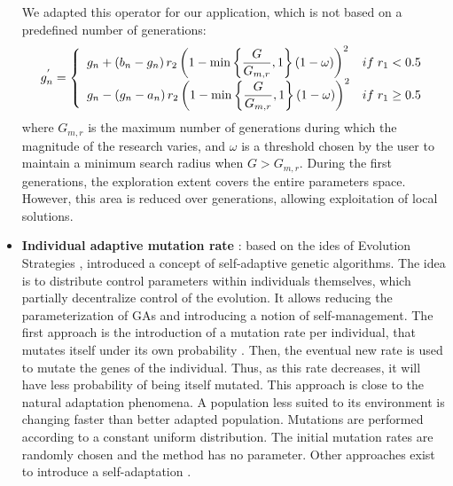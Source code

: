 \documentclass[twocol]{ametsoc}
\begin{document}
\begin{itemize}
	We adapted this operator for our application, which is not based on a predefined number of generations:
	\begin{equation}
	g_{n}^{'} = 
	\left\lbrace \begin{array}{l l} 
	g_{n} + \left(b_{n}-g_{n}\right) r_{2} \left(1 - \min \left\lbrace \dfrac{G}{G_{m,r}}, 1 \right\rbrace \left(1-\omega\right) \right)^{2} & if \; r_{1} < 0.5 \\
	g_{n} - \left(g_{n}-a_{n}\right) r_{2} \left(1 - \min \left\lbrace \dfrac{G}{G_{m,r}}, 1 \right\rbrace \left(1-\omega\right) \right)^{2} & if \; r_{1} \geq 0.5 \\
	\end{array} \right.
	\label{equation_mutation_nonuniform}
	\end{equation}
	where $G_{m,r}$ is the maximum number of generations during which the magnitude of the research varies, and $\omega$ is a threshold chosen by the user to maintain a minimum search radius when $G>G_{m,r}$. During the first generations, the exploration extent covers the entire parameters space. However, this area is reduced over generations, allowing exploitation of local solutions.
	
	\item \textbf{Individual adaptive mutation rate} \citep{Back1992a}: based on the ides of Evolution Strategies \citep[see][]{Rechenberg1973, Schwefel1981}, \citet{Back1992a} introduced a concept of self-adaptive genetic algorithms. The idea is to distribute control parameters within individuals themselves, which partially decentralize control of the evolution. It allows reducing the parameterization of GAs and introducing a notion of self-management. The first approach is the introduction of a mutation rate per individual, that mutates itself under its own probability \citep{Back1992a}. Then, the eventual new rate is used to mutate the genes of the individual. Thus, as this rate decreases, it will have less probability of being itself mutated. This approach is close to the natural adaptation phenomena. A population less suited to its environment is changing faster than better adapted population. Mutations are performed according to a constant uniform distribution. The initial mutation rates are randomly chosen \citep{Back1992a} and the method has no parameter. Other approaches exist to introduce a self-adaptation \citep[see][]{Smith1997a,Deb1999,Deb2001a}.
	

\end{itemize}
\end{document}
